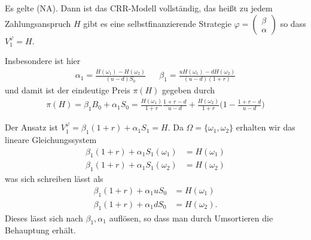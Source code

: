 \documentclass[a4paper,twoside,DIV15,BCOR12mm]{scrbook}
\begin{document}
\begin{lemma}\label{lem:2.4.2}
Es gelte (NA). Dann ist das CRR-Modell vollständig, das heißt zu jedem Zahlungsanspruch $H$ gibt es eine selbstfinanzierende Strategie $\varphi = 
\left(\begin{smallmatrix} \beta \\ \alpha \end{smallmatrix}\right)$
so dass $V_1^\varphi = H$.

Insbesondere ist hier 
\begin{align*}
\alpha_1 = \frac{H(\omega_1) - H (\omega_2)}{(u-d)S_0} && 
\beta_1 = \frac{u H(\omega_1) - d H(\omega_2)}{(u-d)(1+r)}
\end{align*}
und damit ist der eindeutige Preis $\pi(H)$ gegeben durch
\begin{align*}
\pi(H) = \beta_1 B_0 + \alpha_1 S_0 = \frac{H(\omega_1)}{1+r} \frac{1+r-d}{u-d} + \frac{H(\omega_2)}{1+r} \bigg(1 - \frac{1+r-d}{u-d}\bigg)
\end{align*}
\end{lemma}

\begin{beweis}
Der Ansatz ist $V_1^\varphi = \beta_1(1+r) + \alpha_1 S_1 = H$. Da $\Omega=\{\omega_1,\omega_2\}$ erhalten wir das lineare Gleichungssystem
\begin{align*}
\beta_1(1+r) + \alpha_1 S_1(\omega_1) &= H (\omega_1) \\
\beta_1(1+r) + \alpha_1 S_1(\omega_2) &= H (\omega_2) 
\end{align*}
was sich schreiben lässt als
\begin{align*}
\beta_1(1+r) + \alpha_1 u S_0  &= H (\omega_1) \\
\beta_1(1+r) + \alpha_1 d S_0  &= H (\omega_2).
\end{align*}
Dieses lässt sich nach $\beta_1, \alpha_1$ auflösen, so dass man durch Umsortieren die Behauptung erhält.
\end{beweis}
\end{document}
